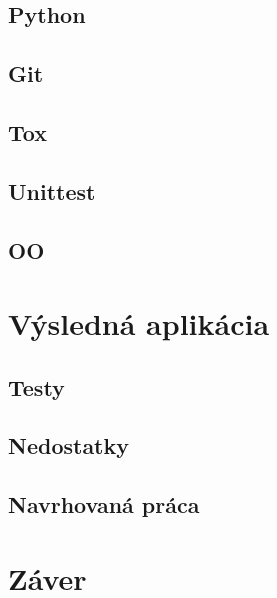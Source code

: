 \section{Python}
\section{Git}
\section{Tox}
\section{Unittest}
\section{OO}
\chapter{Výsledná aplikácia}
\section{Testy}
\section{Nedostatky}
\section{Navrhovaná práca}
\chapter{Záver}

